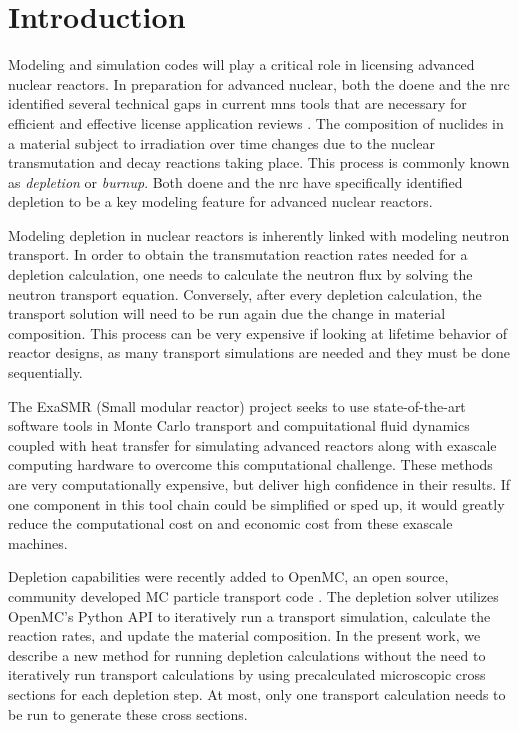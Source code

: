 \section{Introduction}\label{}
    Modeling and simulation codes will play a critical role in licensing
    advanced nuclear reactors. In preparation for advanced nuclear, both the
    \Gls{doene} and the \Gls{nrc} identified several technical gaps in current
    \Gls{mns} tools that are necessary for efficient and effective license
    application reviews \cite{betzler_modeling_2019} \cite{usnrc_nonlwr_2020-1}.
    The composition of nuclides in a material subject to irradiation over time
    changes due to the nuclear transmutation and decay reactions taking place.
    This process is commonly known as {\it depletion} or {\it burnup}.  Both
    \Gls{doene} and the \Gls{nrc} have specifically identified depletion to be a
    key modeling feature for advanced nuclear reactors.
    
    Modeling depletion in nuclear reactors is inherently linked with modeling
    neutron transport. In order to obtain the transmutation reaction rates
    needed for a depletion calculation, one needs to calculate the neutron flux
    by solving the neutron transport equation. Conversely, after every depletion
    calculation, the transport solution will need  to be run again due the
    change in material composition. This process can be very expensive if
    looking at lifetime behavior of reactor designs, as many transport
    simulations are needed and they must be done sequentially.

    The ExaSMR (Small modular reactor) project seeks to use state-of-the-art
    software tools in Monte Carlo transport and compuitational fluid dynamics
    coupled with heat transfer for simulating advanced reactors along with
    exascale computing hardware to overcome this computational challenge. These
    methods are very computationally expensive, but deliver high confidence in
    their results. If one component in this tool chain could be simplified or
    sped up, it would greatly reduce the computational cost on and economic cost
    from these exascale machines.

    Depletion capabilities were recently added to OpenMC, an open source,
    community developed MC particle transport code \cite{romano_openmc_2015}
    \cite{romano_depletion_2021}. The depletion solver utilizes OpenMC's Python
    API to iteratively run a transport simulation, calculate the reaction rates,
    and update the material composition. In the present work, we describe a new
    method for running depletion calculations without the need to iteratively
    run transport calculations by using precalculated microscopic cross sections
    for each depletion step. At most, only one transport calculation needs to be
    run to generate these cross sections.

